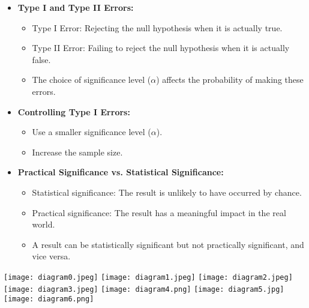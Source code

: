 \documentclass{article}
\begin{document}
\begin{multicols}{2}
\begin{itemize}
\item \textbf{Type I and Type II Errors:}
    \begin{itemize}
        \item Type I Error: Rejecting the null hypothesis when it is actually true.
        \item Type II Error: Failing to reject the null hypothesis when it is actually false.
        \item The choice of significance level ($\alpha$) affects the probability of making these errors.
    \end{itemize}
\item \textbf{Controlling Type I Errors:}
    \begin{itemize}
        \item Use a smaller significance level ($\alpha$).
        \item Increase the sample size.
    \end{itemize}
\item \textbf{Practical Significance vs. Statistical Significance:}
    \begin{itemize}
        \item Statistical significance: The result is unlikely to have occurred by chance.
        \item Practical significance: The result has a meaningful impact in the real world.
        \item A result can be statistically significant but not practically significant, and vice versa.
    \end{itemize}
\end{itemize} 
\texttt{[image: diagram0.jpeg]}
\texttt{[image: diagram1.jpeg]}
\texttt{[image: diagram2.jpeg]}
\texttt{[image: diagram3.jpeg]}
\texttt{[image: diagram4.png]}
\texttt{[image: diagram5.jpg]}
\texttt{[image: diagram6.png]}
\end{multicols}
\end{document}
